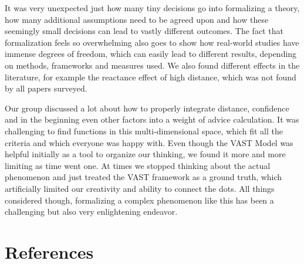 \documentclass[
  man,floatsintext]{apa6}
\begin{document}
It was very unexpected just how many tiny decisions go into formalizing a theory, how many additional assumptions need to be agreed upon and how these seemingly small decisions can lead to vastly different outcomes. The fact that formalization feels so overwhelming also goes to show how real-world studies have immense degrees of freedom, which can easily lead to different results, depending on methods, frameworks and measures used. We also found different effects in the literature, for example the reactance effect of high distance, which was not found by all papers surveyed.

Our group discussed a lot about how to properly integrate distance, confidence and in the beginning even other factors into a weight of advice calculation. It was challenging to find functions in this multi-dimensional space, which fit all the criteria and which everyone was happy with. Even though the VAST Model was helpful initially as a tool to organize our thinking, we found it more and more limiting as time went one. At times we stopped thinking about the actual phenomenon and just treated the VAST framework as a ground truth, which artificially limited our creativity and ability to connect the dots. All things considered though, formalizing a complex phenomenon like this has been a challenging but also very enlightening endeavor.

\newpage

\hypertarget{references}{%
\section{References}\label{references}}
\end{document}
